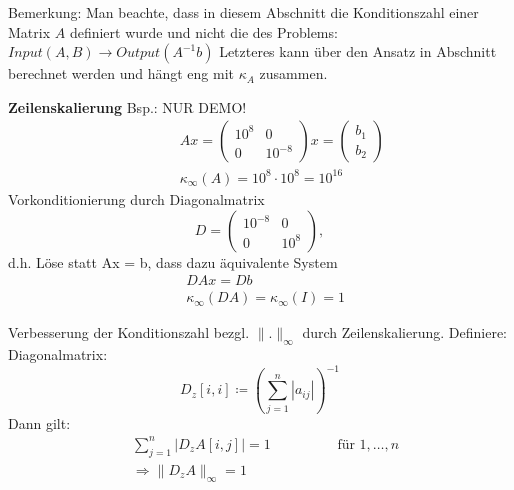 Bemerkung: Man beachte, dass in diesem Abschnitt die Konditionszahl einer Matrix $A$ definiert wurde und nicht die des Problems:
$Input\left(A,B\right) \rightarrow Output\left(A^{-1}b\right)$
Letzteres kann über den Ansatz in Abschnitt  berechnet werden und hängt eng mit $\kappa_A$ zusammen.

\textbf{Zeilenskalierung}
Bsp.: NUR DEMO!
\begin{equation*}
  \begin{aligned}
    \hspace{1cm} &Ax = \begin{pmatrix} 10^8 & 0 \\ 0 & 10^{-8} \end{pmatrix} x = \begin{pmatrix}b_1 \\ b_2\end{pmatrix} \\
    &\kappa_\infty\left(A\right) = 10^8 \cdot 10^8 = 10^{16}
  \end{aligned}
\end{equation*}
Vorkonditionierung durch Diagonalmatrix
\begin{equation*}
  D = \begin{pmatrix}10^{-8} & 0 \\ 0 & 10^8\end{pmatrix},
\end{equation*}
d.h. Löse statt Ax = b, dass dazu äquivalente System
\begin{equation*}
  \begin{aligned}
    &DAx = Db \\
    &\kappa_\infty\left(DA\right) = \kappa_\infty\left(I\right) = 1
	\end{aligned}	
\end{equation*}

Verbesserung der Konditionszahl bezgl. $\|.\|_\infty$ durch Zeilenskalierung.
Definiere: Diagonalmatrix:
\begin{equation*}
  D_z \left[ i,i \right] \coloneqq \left(\sum\limits_{j=1}^{n}{\left|a_{ij}\right|}\right)^{-1} %
\end{equation*}
Dann gilt:
\begin{equation*}
  \begin{aligned}
    &\sum\limits_{j=1}^{n}{\left|D_zA\left[i,j\right]\right|} = 1  \hspace{2cm} \text{für } 1, \ldots, n \\
    &\Rightarrow \|D_zA\|_\infty = 1
		\end{aligned}
\end{equation*}

